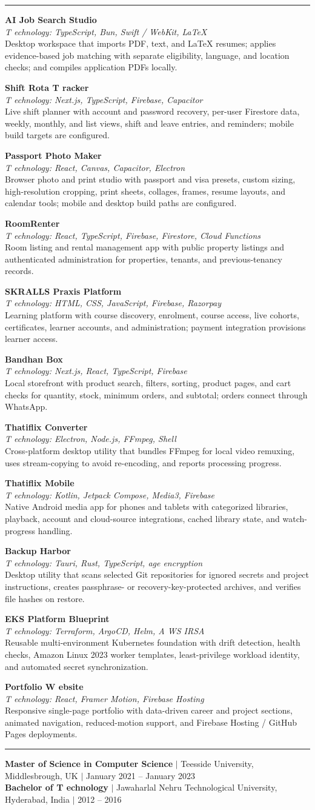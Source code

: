 \documentclass[letterpaper,10pt]{article}
\newcommand{\cvSection}[1]{\vspace{8pt}\noindent{\large\bfseries #1}\par\vspace{2pt}\hrule\vspace{4pt}}
\newcommand{\resumeProject}[3]{\Needspace{4\baselineskip}\textbf{#1}\\[-1pt]\textit{T\kern0pt echnology: #2}\\[-2pt]#3\par\vspace{3pt}}
\begin{document}
\cvSection{Selected Software and Platform Projects}
\resumeProject{AI Job Search Studio}{TypeScript, Bun, Swift / WebKit, LaTeX}{Desktop workspace that imports PDF, text, and LaTeX resumes; applies evidence-based job matching with separate eligibility, language, and location checks; and compiles application PDFs locally.}
\resumeProject{Shift Rota T\kern0pt racker}{Next.js, TypeScript, Firebase, Capacitor}{Live shift planner with account and password recovery, per-user Firestore data, weekly, monthly, and list views, shift and leave entries, and reminders; mobile build targets are configured.}
\resumeProject{Passport Photo Maker}{React, Canvas, Capacitor, Electron}{Browser photo and print studio with passport and visa presets, custom sizing, high-resolution cropping, print sheets, collages, frames, resume layouts, and calendar tools; mobile and desktop build paths are configured.}
\resumeProject{RoomRenter}{React, TypeScript, Firebase, Firestore, Cloud Functions}{Room listing and rental management app with public property listings and authenticated administration for properties, tenants, and previous-tenancy records.}
\resumeProject{SKRALLS Praxis Platform}{HTML, CSS, JavaScript, Firebase, Razorpay}{Learning platform with course discovery, enrolment, course access, live cohorts, certificates, learner accounts, and administration; payment integration provisions learner access.}
\resumeProject{Bandhan Box}{Next.js, React, TypeScript, Firebase}{Local storefront with product search, f{}ilters, sorting, product pages, and cart checks for quantity, stock, minimum orders, and subtotal; orders connect through WhatsApp.}
\resumeProject{Thati{}flix Converter}{Electron, Node.js, FFmpeg, Shell}{Cross-platform desktop utility that bundles FFmpeg for local video remuxing, uses stream-copying to avoid re-encoding, and reports processing progress.}
\resumeProject{Thati{}flix Mobile}{Kotlin, Jetpack Compose, Media3, Firebase}{Native Android media app for phones and tablets with categorized libraries, playback, account and cloud-source integrations, cached library state, and watch-progress handling.}
\resumeProject{Backup Harbor}{Tauri, Rust, TypeScript, age encryption}{Desktop utility that scans selected Git repositories for ignored secrets and project instructions, creates passphrase- or recovery-key-protected archives, and verifies file hashes on restore.}
\resumeProject{EKS Platform Blueprint}{Terraform, ArgoCD, Helm, A\kern0pt WS IRSA}{Reusable multi-environment Kubernetes foundation with drift detection, health checks, Amazon Linux 2023 worker templates, least-privilege workload identity, and automated secret synchronization.}
\resumeProject{Portfolio W\kern0pt ebsite}{React, Framer Motion, Firebase Hosting}{Responsive single-page portfolio with data-driven career and project sections, animated navigation, reduced-motion support, and Firebase Hosting / GitHub Pages deployments.}

\cvSection{Education}
\textbf{Master of Science in Computer Science} $|$ Teesside University, Middlesbrough, UK $|$ January 2021 -- January 2023\\
\textbf{Bachelor of T\kern0pt echnology} $|$ Jawaharlal Nehru Technological University, Hyderabad, India $|$ 2012 -- 2016
\end{document}

